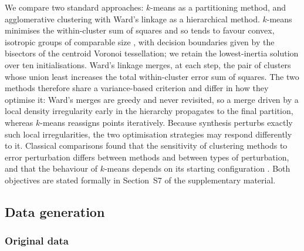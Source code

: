 \documentclass[pdflatex,referee]{sn-jnl}
\begin{document}
We compare two standard approaches: $k$-means \citep{macqueen1967} as a
partitioning method, and agglomerative clustering with Ward's linkage
\citep{ward1963} as a hierarchical method. $k$-means minimises the
within-cluster sum of squares and so tends to favour convex, isotropic groups
of comparable size \citep{steinley2006,xiong2009}, with decision boundaries
given by the bisectors of the centroid Voronoi tessellation; we retain the
lowest-inertia solution over ten initialisations. Ward's linkage merges, at
each step, the pair of clusters whose union least increases the total
within-cluster error sum of squares. The two methods therefore share a
variance-based criterion and differ in how they optimise it: Ward's merges are
greedy and never revisited, so a merge driven by a local density irregularity
early in the hierarchy propagates to the final partition, whereas $k$-means
reassigns points iteratively. Because synthesis perturbs exactly such local
irregularities, the two optimisation strategies may respond differently to it.
Classical comparisons found that the sensitivity of clustering methods to
error perturbation differs between methods and between types of perturbation,
and that the behaviour of $k$-means depends on its starting configuration
\citep{milligan1980}. Both objectives are stated formally in Section~S7 of the
supplementary material.

\subsection{Data generation}

\subsubsection{Original data}
\end{document}
